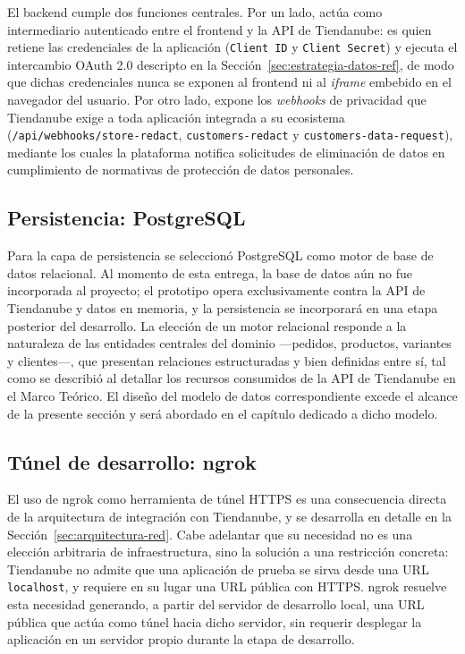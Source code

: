 El backend cumple dos funciones centrales. Por un lado, actúa como intermediario autenticado entre el frontend y la API de Tiendanube: es quien retiene las credenciales de la aplicación (\texttt{Client ID} y \texttt{Client Secret}) y ejecuta el intercambio OAuth 2.0 descripto en la Sección~\ref{sec:estrategia-datos-ref}, de modo que dichas credenciales nunca se exponen al frontend ni al \emph{iframe} embebido en el navegador del usuario. Por otro lado, expone los \emph{webhooks} de privacidad que Tiendanube exige a toda aplicación integrada a su ecosistema (\texttt{/api/webhooks/store-redact}, \texttt{customers-redact} y \texttt{customers-data-request}), mediante los cuales la plataforma notifica solicitudes de eliminación de datos en cumplimiento de normativas de protección de datos personales.

\subsection{Persistencia: PostgreSQL}

Para la capa de persistencia se seleccionó PostgreSQL como motor de base de datos relacional. Al momento de esta entrega, la base de datos aún no fue incorporada al proyecto; el prototipo opera exclusivamente contra la API de Tiendanube y datos en memoria, y la persistencia se incorporará en una etapa posterior del desarrollo. La elección de un motor relacional responde a la naturaleza de las entidades centrales del dominio ---pedidos, productos, variantes y clientes---, que presentan relaciones estructuradas y bien definidas entre sí, tal como se describió al detallar los recursos consumidos de la API de Tiendanube en el Marco Teórico. El diseño del modelo de datos correspondiente excede el alcance de la presente sección y será abordado en el capítulo dedicado a dicho modelo.

\subsection{Túnel de desarrollo: ngrok}

El uso de ngrok como herramienta de túnel HTTPS es una consecuencia directa de la arquitectura de integración con Tiendanube, y se desarrolla en detalle en la Sección~\ref{sec:arquitectura-red}. Cabe adelantar que su necesidad no es una elección arbitraria de infraestructura, sino la solución a una restricción concreta: Tiendanube no admite que una aplicación de prueba se sirva desde una URL \texttt{localhost}, y requiere en su lugar una URL pública con HTTPS. ngrok resuelve esta necesidad generando, a partir del servidor de desarrollo local, una URL pública que actúa como túnel hacia dicho servidor, sin requerir desplegar la aplicación en un servidor propio durante la etapa de desarrollo.

